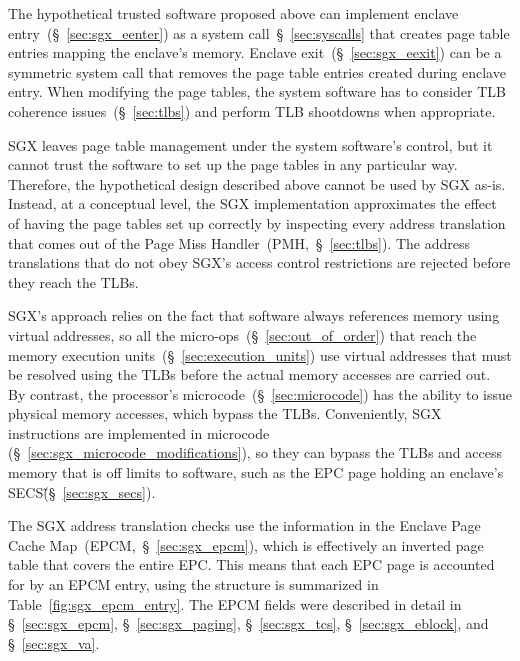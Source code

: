 The hypothetical trusted software proposed above can implement enclave
entry~(\S~\ref{sec:sgx_eenter}) as a system call~\S~\ref{sec:syscalls} that
creates page table entries mapping the enclave's memory. Enclave
exit~(\S~\ref{sec:sgx_eexit}) can be a symmetric system call that removes the
page table entries created during enclave entry.  When modifying the page
tables, the system software has to consider TLB coherence
issues~(\S~\ref{sec:tlbs}) and perform TLB shootdowns when appropriate.

SGX leaves page table management under the system software's control, but it
cannot trust the software to set up the page tables in any particular way.
Therefore, the hypothetical design described above cannot be used by SGX as-is.
Instead, at a conceptual level, the SGX implementation approximates the effect
of having the page tables set up correctly by inspecting every address
translation that comes out of the Page Miss Handler~(PMH,~\S~\ref{sec:tlbs}).
The address translations that do not obey SGX's access control restrictions
are rejected before they reach the TLBs.

SGX's approach relies on the fact that software always references memory using
virtual addresses, so all the micro-ops~(\S~\ref{sec:out_of_order}) that reach
the memory execution units~(\S~\ref{sec:execution_units}) use virtual addresses
that must be resolved using the TLBs before the actual memory accesses are
carried out. By contrast, the processor's microcode~(\S~\ref{sec:microcode})
has the ability to issue physical memory accesses, which bypass the TLBs.
Conveniently, SGX instructions are implemented in microcode
(\S~\ref{sec:sgx_microcode_modifications}), so they can bypass the TLBs and
access memory that is off limits to software, such as the EPC page holding an
enclave's SECS\~(\S~\ref{sec:sgx_secs}).


The SGX address translation checks use the information in the Enclave Page
Cache Map~(EPCM,~\S~\ref{sec:sgx_epcm}), which is effectively an inverted page
table that covers the entire EPC. This means that each EPC page is accounted
for by an EPCM entry, using the structure is summarized in
Table~\ref{fig:sgx_epcm_entry}. The EPCM fields were described in detail in
\S~\ref{sec:sgx_epcm}, \S~\ref{sec:sgx_paging}, \S~\ref{sec:sgx_tcs},
\S~\ref{sec:sgx_eblock}, and \S~\ref{sec:sgx_va}.


